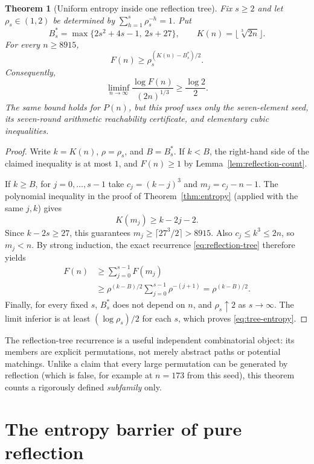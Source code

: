 \documentclass[10pt]{article}
\newtheorem{theorem}{Theorem}
\begin{document}
\begin{theorem}[Uniform entropy inside one reflection tree]
\label{thm:treeentropy}
Fix $s\ge2$ and let $\rho_s\in(1,2)$
be determined by
$\sum_{h=1}^{s}\rho_s^{-h}=1$.
Put
\[
B_s^\ast=\max\{2s^2+4s-1,\ 2s+27\},
\qquad K(n)=\lfloor\sqrt[3]{2n}\rfloor.
\]
For every $n\ge8915$,
\[
\boxed{\displaystyle
F(n)\ge\rho_s^{(K(n)-B_s^\ast)/2}.}
\]
Consequently,
\begin{equation}\label{eq:tree-entropy}
\boxed{\displaystyle
\liminf_{n\to\infty}
\frac{\log F(n)}{(2n)^{1/3}}
\ge\frac{\log2}{2}.}
\end{equation}
The same bound holds for $P(n)$,
but this proof uses only the
seven-element seed, its seven-round
arithmetic reachability certificate,
and elementary cubic inequalities.
\end{theorem}
\begin{proof}
Write $k=K(n)$, $\rho=\rho_s$,
and $B=B_s^\ast$. If $k<B$,
the right-hand side of the claimed
inequality is at most $1$,
and $F(n)\ge1$ by
Lemma~\ref{lem:reflection-count}.

If $k\ge B$, for $j=0,\ldots,s-1$
take $c_j=(k-j)^3$ and
$m_j=c_j-n-1$. The polynomial
inequality in the proof of
Theorem~\ref{thm:entropy}
(applied with the same $j,k$)
gives
\[
K(m_j)\ge k-2j-2.
\]
Since $k-2s\ge27$, this
guarantees $m_j\ge
\lceil27^3/2\rceil>8915$.
Also $c_j\le k^3\le2n$,
so $m_j<n$.
By strong induction, the exact
recurrence \eqref{eq:reflection-tree}
therefore yields
\[
\begin{aligned}
F(n)&\ge\sum_{j=0}^{s-1}F(m_j)\\
&\ge \rho^{(k-B)/2}
\sum_{j=0}^{s-1}\rho^{-(j+1)}
=\rho^{(k-B)/2}.
\end{aligned}
\]
Finally, for every fixed $s$,
$B_s^\ast$ does not depend on $n$,
and $\rho_s\uparrow2$ as $s\to\infty$.
The limit inferior is at least
$(\log\rho_s)/2$ for each $s$,
which proves \eqref{eq:tree-entropy}.
\end{proof}

The reflection-tree recurrence
is a useful independent combinatorial
object: its members are explicit
permutations, not merely abstract
paths or potential matchings.
Unlike a claim that every large
permutation can be generated by
reflection (which is false, for
example at $n=173$ from this seed),
this theorem counts a rigorously
defined \emph{subfamily} only.

\section{The entropy barrier of pure reflection}
\label{sec:reflection-barrier}
\end{document}
